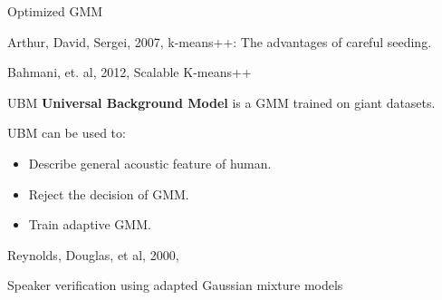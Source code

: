 \begin{frame}{Optimized GMM}
  \begin{reference}{4mm}{85mm}
    Arthur, David, Sergei, 2007,
    k-means++: The advantages of careful seeding.

    Bahmani, et. al, 2012,
    Scalable K-means++
  \end{reference}
\end{frame}

\begin{frame}{UBM}
  \textbf{Universal Background Model} is a GMM trained on giant datasets.

  UBM can be used to:
  \begin{itemize}
    \item Describe general acoustic feature of human.
    \item Reject the decision of GMM.
    \item Train adaptive GMM.
  \end{itemize}

  \begin{reference}{4mm}{85mm}
    Reynolds, Douglas, et al, 2000,

    Speaker verification using adapted Gaussian mixture models
  \end{reference}
\end{frame}


